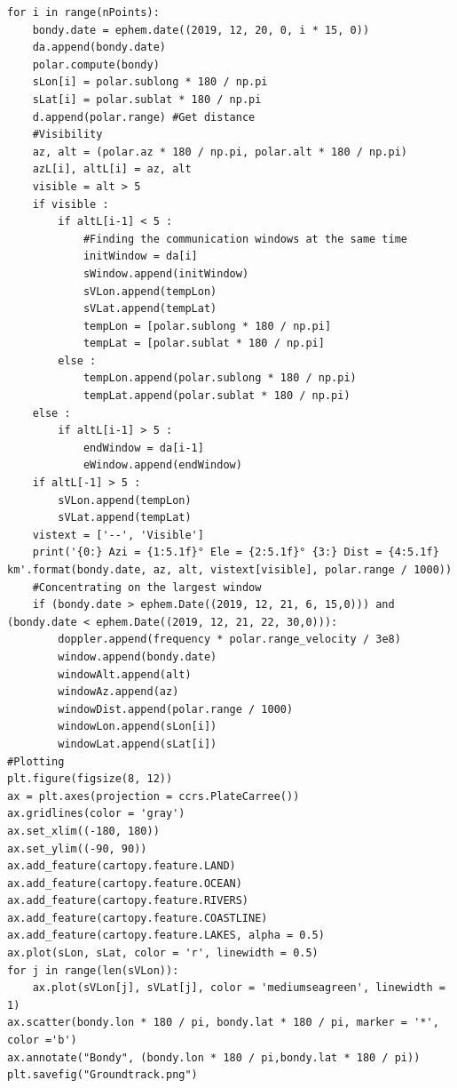 \documentclass[a4paper,12pt,calibri,oneside,openany]{book}
\theoremstyle{break}
\begin{document}
\begin{verbatim}
for i in range(nPoints):
    bondy.date = ephem.date((2019, 12, 20, 0, i * 15, 0))
    da.append(bondy.date)
    polar.compute(bondy)
    sLon[i] = polar.sublong * 180 / np.pi
    sLat[i] = polar.sublat * 180 / np.pi
    d.append(polar.range) #Get distance
    #Visibility 
    az, alt = (polar.az * 180 / np.pi, polar.alt * 180 / np.pi)
    azL[i], altL[i] = az, alt
    visible = alt > 5
    if visible :
        if altL[i-1] < 5 :
            #Finding the communication windows at the same time
            initWindow = da[i]
            sWindow.append(initWindow)
            sVLon.append(tempLon)
            sVLat.append(tempLat)
            tempLon = [polar.sublong * 180 / np.pi]
            tempLat = [polar.sublat * 180 / np.pi]
        else :
            tempLon.append(polar.sublong * 180 / np.pi)
            tempLat.append(polar.sublat * 180 / np.pi)
    else :
        if altL[i-1] > 5 :
            endWindow = da[i-1]
            eWindow.append(endWindow)
    if altL[-1] > 5 :
        sVLon.append(tempLon)
        sVLat.append(tempLat)
    vistext = ['--', 'Visible']
    print('{0:} Azi = {1:5.1f}° Ele = {2:5.1f}° {3:} Dist = {4:5.1f} km'.format(bondy.date, az, alt, vistext[visible], polar.range / 1000))
    #Concentrating on the largest window
    if (bondy.date > ephem.Date((2019, 12, 21, 6, 15,0))) and (bondy.date < ephem.Date((2019, 12, 21, 22, 30,0))):
        doppler.append(frequency * polar.range_velocity / 3e8)
        window.append(bondy.date)
        windowAlt.append(alt)
        windowAz.append(az)
        windowDist.append(polar.range / 1000)
        windowLon.append(sLon[i])
        windowLat.append(sLat[i])
#Plotting
plt.figure(figsize(8, 12))
ax = plt.axes(projection = ccrs.PlateCarree())
ax.gridlines(color = 'gray')
ax.set_xlim((-180, 180))
ax.set_ylim((-90, 90))
ax.add_feature(cartopy.feature.LAND)
ax.add_feature(cartopy.feature.OCEAN)
ax.add_feature(cartopy.feature.RIVERS)
ax.add_feature(cartopy.feature.COASTLINE)
ax.add_feature(cartopy.feature.LAKES, alpha = 0.5)
ax.plot(sLon, sLat, color = 'r', linewidth = 0.5)
for j in range(len(sVLon)):
    ax.plot(sVLon[j], sVLat[j], color = 'mediumseagreen', linewidth = 1)
ax.scatter(bondy.lon * 180 / pi, bondy.lat * 180 / pi, marker = '*', color ='b')
ax.annotate("Bondy", (bondy.lon * 180 / pi,bondy.lat * 180 / pi))
plt.savefig("Groundtrack.png")
\end{verbatim}
\end{document}
